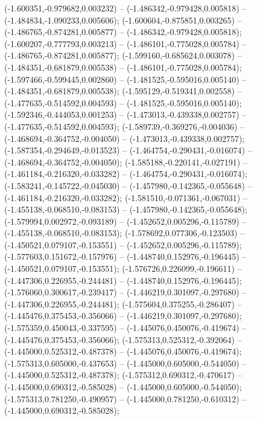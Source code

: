  (-1.600351,-0.979682,0.003232) -- (-1.486342,-0.979428,0.005818) -- (-1.484834,-1.090233,0.005606);
 (-1.600604,-0.875851,0.003265) -- (-1.486765,-0.874281,0.005877) -- (-1.486342,-0.979428,0.005818);
 (-1.600207,-0.777793,0.003213) -- (-1.486101,-0.775028,0.005784) -- (-1.486765,-0.874281,0.005877);
 (-1.599160,-0.685624,0.003078) -- (-1.484351,-0.681879,0.005538) -- (-1.486101,-0.775028,0.005784);
 (-1.597466,-0.599445,0.002860) -- (-1.481525,-0.595016,0.005140) -- (-1.484351,-0.681879,0.005538);
 (-1.595129,-0.519341,0.002558) -- (-1.477635,-0.514592,0.004593) -- (-1.481525,-0.595016,0.005140);
 (-1.592346,-0.444053,0.001253) -- (-1.473013,-0.439338,0.002757) -- (-1.477635,-0.514592,0.004593);
 (-1.589739,-0.369276,-0.004036) -- (-1.468694,-0.364752,-0.004050) -- (-1.473013,-0.439338,0.002757);
 (-1.587354,-0.294649,-0.013523) -- (-1.464754,-0.290431,-0.016074) -- (-1.468694,-0.364752,-0.004050);
 (-1.585188,-0.220141,-0.027191) -- (-1.461184,-0.216320,-0.033282) -- (-1.464754,-0.290431,-0.016074);
 (-1.583241,-0.145722,-0.045030) -- (-1.457980,-0.142365,-0.055648) -- (-1.461184,-0.216320,-0.033282);
 (-1.581510,-0.071361,-0.067031) -- (-1.455138,-0.068510,-0.083153) -- (-1.457980,-0.142365,-0.055648);
 (-1.579994,0.002972,-0.093189) -- (-1.452652,0.005296,-0.115789) -- (-1.455138,-0.068510,-0.083153);
 (-1.578692,0.077306,-0.123503) -- (-1.450521,0.079107,-0.153551) -- (-1.452652,0.005296,-0.115789);
 (-1.577603,0.151672,-0.157976) -- (-1.448740,0.152976,-0.196445) -- (-1.450521,0.079107,-0.153551);
 (-1.576726,0.226099,-0.196611) -- (-1.447306,0.226955,-0.244481) -- (-1.448740,0.152976,-0.196445);
 (-1.576060,0.300617,-0.239417) -- (-1.446219,0.301097,-0.297680) -- (-1.447306,0.226955,-0.244481);
 (-1.575604,0.375255,-0.286407) -- (-1.445476,0.375453,-0.356066) -- (-1.446219,0.301097,-0.297680);
 (-1.575359,0.450043,-0.337595) -- (-1.445076,0.450076,-0.419674) -- (-1.445476,0.375453,-0.356066);
 (-1.575313,0.525312,-0.392064) -- (-1.445000,0.525312,-0.487378) -- (-1.445076,0.450076,-0.419674);
 (-1.575313,0.605000,-0.437653) -- (-1.445000,0.605000,-0.544050) -- (-1.445000,0.525312,-0.487378);
 (-1.575312,0.690312,-0.470617) -- (-1.445000,0.690312,-0.585028) -- (-1.445000,0.605000,-0.544050);
 (-1.575313,0.781250,-0.490957) -- (-1.445000,0.781250,-0.610312) -- (-1.445000,0.690312,-0.585028);
